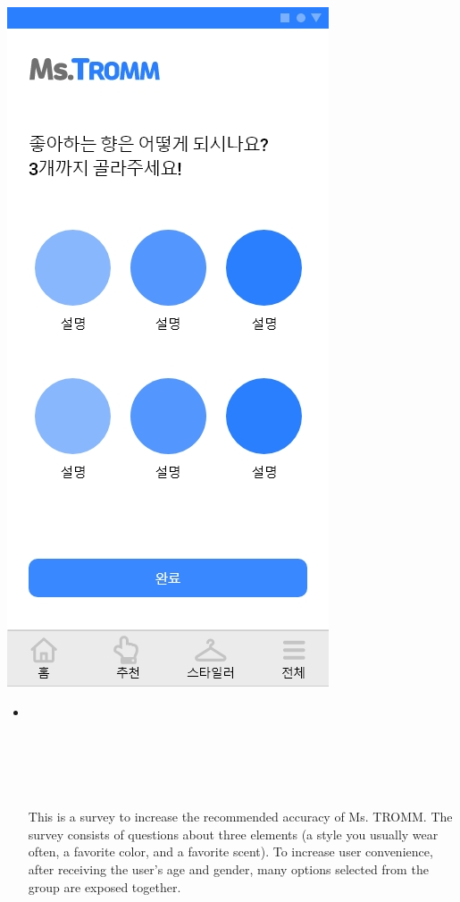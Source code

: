 \documentclass[conference]{IEEEtran}
\begin{document}
\begin{enumerate}
\begin{enumerate}
{            \includegraphics[scale=0.17]{5-3. 설문.jpg}}
            \break
    \begin{itemize}
        \item[] \\ \\ \\ \\ \\ \\ This is a survey to increase the recommended accuracy of Ms. TROMM. The survey consists of questions about three elements (a style you usually wear often, a favorite color, and a favorite scent). To increase user convenience, after receiving the user's age and gender, many options selected from the group are exposed together.\\

\end{itemize}
\end{enumerate}
\end{enumerate}
\end{document}
